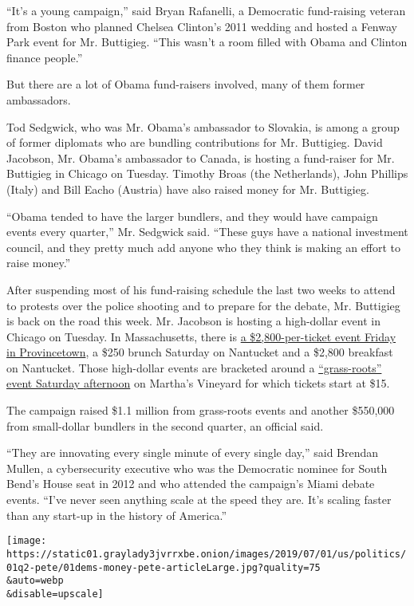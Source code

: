 ``It's a young campaign,'' said Bryan Rafanelli, a Democratic
fund-raising veteran from Boston who planned Chelsea Clinton's 2011
wedding and hosted a Fenway Park event for Mr. Buttigieg. ``This wasn't
a room filled with Obama and Clinton finance people.''

But there are a lot of Obama fund-raisers involved, many of them former
ambassadors.

Tod Sedgwick, who was Mr. Obama's ambassador to Slovakia, is among a
group of former diplomats who are bundling contributions for Mr.
Buttigieg. David Jacobson, Mr. Obama's ambassador to Canada, is hosting
a fund-raiser for Mr. Buttigieg in Chicago on Tuesday. Timothy Broas
(the Netherlands), John Phillips (Italy) and Bill Eacho (Austria) have
also raised money for Mr. Buttigieg.

``Obama tended to have the larger bundlers, and they would have campaign
events every quarter,'' Mr. Sedgwick said. ``These guys have a national
investment council, and they pretty much add anyone who they think is
making an effort to raise money.''

After suspending most of his fund-raising schedule the last two weeks to
attend to protests over the police shooting and to prepare for the
debate, Mr. Buttigieg is back on the road this week. Mr. Jacobson is
hosting a high-dollar event in Chicago on Tuesday. In Massachusetts,
there is \href{https://secure.actblue.com/donate/7.6.19_grassroots_mv}{a
\$2,800-per-ticket event Friday in Provincetown}, a \$250 brunch
Saturday on Nantucket and a \$2,800 breakfast on Nantucket. Those
high-dollar events are bracketed around a
\href{https://secure.actblue.com/donate/7.6.19_grassroots_mv}{``grass-roots''
event Saturday afternoon} on Martha's Vineyard for which tickets start
at \$15.

The campaign raised \$1.1 million from grass-roots events and another
\$550,000 from small-dollar bundlers in the second quarter, an official
said.

``They are innovating every single minute of every single day,'' said
Brendan Mullen, a cybersecurity executive who was the Democratic nominee
for South Bend's House seat in 2012 and who attended the campaign's
Miami debate events. ``I've never seen anything scale at the speed they
are. It's scaling faster than any start-up in the history of America.''

\texttt{[image: https://static01.graylady3jvrrxbe.onion/images/2019/07/01/us/politics/01q2-pete/01dems-money-pete-articleLarge.jpg?quality=75\\\&auto=webp\\\&disable=upscale]}

